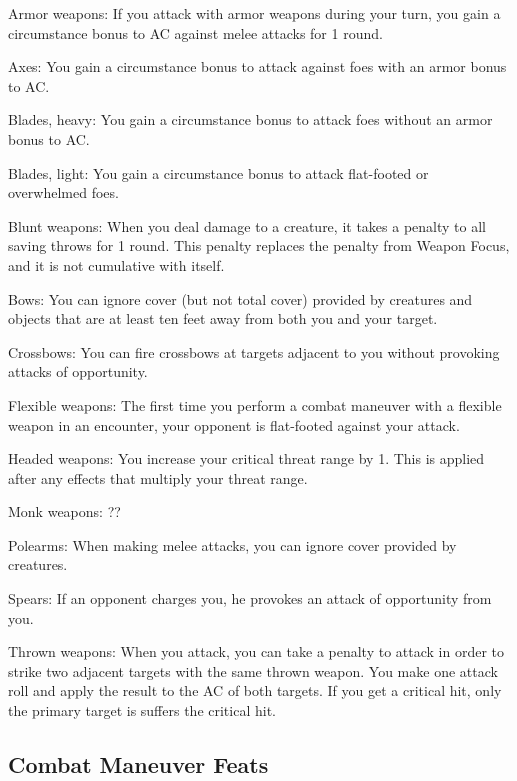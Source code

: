 \begin{itemize*}
    \item Armor weapons: If you attack with armor weapons during your turn, you gain a  circumstance bonus to AC against melee attacks for 1 round.
    \item Axes: You gain a  circumstance bonus to attack against foes with an armor bonus to AC.
    \item Blades, heavy: You gain a  circumstance bonus to attack foes without an armor bonus to AC.
    \item Blades, light: You gain a  circumstance bonus to attack flat-footed or overwhelmed foes.
    \item Blunt weapons: When you deal damage to a creature, it takes a  penalty to all saving throws for 1 round. This penalty replaces the penalty from Weapon Focus, and it is not cumulative with itself.
    \item Bows: You can ignore cover (but not total cover) provided by creatures and objects that are at least ten feet away from both you and your target.
    \item Crossbows: You can fire crossbows at targets adjacent to you without provoking attacks of opportunity.
    \item Flexible weapons: The first time you perform a combat maneuver with a flexible weapon in an encounter, your opponent is flat-footed against your attack.
    \item Headed weapons: You increase your critical threat range by 1. This is applied after any effects that multiply your threat range.
    \item Monk weapons: ??
    \item Polearms: When making melee attacks, you can ignore cover provided by creatures.
    \item Spears: If an opponent charges you, he provokes an attack of opportunity from you.
    \item Thrown weapons: When you attack, you can take a  penalty to attack in order to strike two adjacent targets with the same thrown weapon. You make one attack roll and apply the result to the AC of both targets. If you get a critical hit, only the primary target is suffers the critical hit. 
\end{itemize*}

\subsection{Combat Maneuver Feats}

